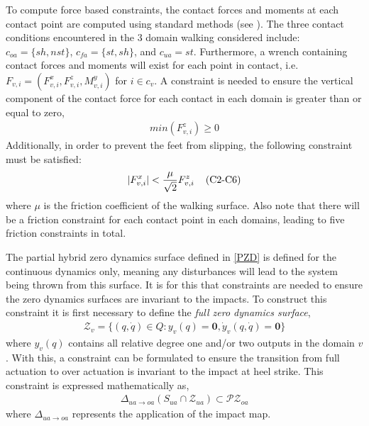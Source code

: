  To compute force based constraints, the contact forces and moments at each contact point are computed using standard methods (see \cite{GCAS10}). The three contact conditions encountered in the 3 domain walking considered include: $c_{oa} = \{sh, nst\}$, $c_{fa} = \{st, sh\}$, and $c_{ua} = st$. Furthermore, a wrench containing contact forces and moments will exist for each point in contact, i.e. $F_{v,i} = (F^{x}_{v,i},F^{z}_{v,i},M^{y}_{v,i})$ for $i \in c_{v}$. A constraint is needed to ensure the vertical component of the contact force for each contact in each domain is greater than or equal to zero,
\begin{align}
min(F^{z}_{v,i}) \geq 0 \tag{C1}
\end{align}
Additionally, in order to prevent the feet from slipping, the following constraint must be satisfied:
\begin{align}
|F^{x}_{v,i}| < \frac{\mu}{\sqrt{2}} F^{z}_{v,i} \hspace{-3mm} \tag{C2-C6}
\end{align}
where $\mu$ is the friction coefficient of the walking surface. Also note that there will be a friction constraint 
for each contact point in each domains, leading to five friction constraints in total.

 The partial hybrid zero dynamics surface defined in \eqref{PZD} is defined for the continuous dynamics only, meaning any disturbances will lead to the system being thrown from this surface. It is for this that constraints are needed to ensure the zero dynamics surfaces are invariant to the 
impacts. To construct this constraint it is first necessary to define the \emph{full zero dynamics surface},
\begin{align}
\mathcal{Z}_{v} = \{(q,\dot{q}) \in Q : y_{v}(q) = \mathbf{0}, \dot{y}_{v}(q,\dot{q}) = \mathbf{0}\}
\end{align}
where $y_{v}(q)$ contains all relative degree one and/or two outputs in the domain $v$. With this, 
a constraint can be formulated to ensure the transition from full actuation to over actuation is 
invariant to the impact at heel strike. This constraint is expressed mathematically as,
\begin{align}
\Delta_{ua \rightarrow oa}(S_{ua} \cap \mathcal{Z}_{ua}) \subset \mathcal{PZ}_{oa} \tag{C7}
\end{align}
where $\Delta_{ua \rightarrow oa}$ represents the application of the impact map.

